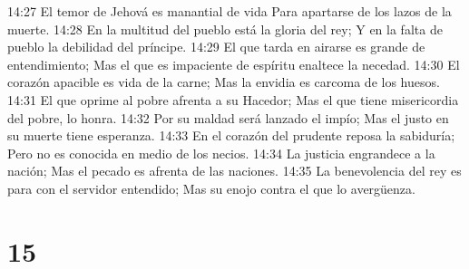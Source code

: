 14:27 El temor de Jehová es manantial de vida  
Para apartarse de los lazos de la muerte.  
14:28 En la multitud del pueblo está la gloria del rey;  
Y en la falta de pueblo la debilidad del príncipe.  
14:29 El que tarda en airarse es grande de entendimiento;  
Mas el que es impaciente de espíritu enaltece la necedad.  
14:30 El corazón apacible es vida de la carne;  
Mas la envidia es carcoma de los huesos.  
14:31 El que oprime al pobre afrenta a su Hacedor;  
Mas el que tiene misericordia del pobre, lo honra.  
14:32 Por su maldad será lanzado el impío;  
Mas el justo en su muerte tiene esperanza.  
14:33 En el corazón del prudente reposa la sabiduría;  
Pero no es conocida en medio de los necios.  
14:34 La justicia engrandece a la nación;  
Mas el pecado es afrenta de las naciones.  
14:35 La benevolencia del rey es para con el servidor entendido;  
Mas su enojo contra el que lo avergüenza.  

\chapter{15}


